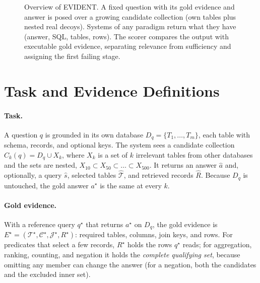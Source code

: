 \documentclass[11pt]{article}
\newcommand{\benchmark}{\mbox{EVIDENT}}  %
\begin{document}
\begin{figure}[t]
{}
\caption{Overview of \benchmark. A fixed question with its gold evidence and answer is posed over a growing candidate collection (own tables plus nested real decoys). Systems of any paradigm return what they have (answer, SQL, tables, rows). The scorer compares the output with executable gold evidence, separating relevance from sufficiency and assigning the first failing stage.}\label{fig:overview}
\end{figure}

\section{Task and Evidence Definitions}\label{sec:task}
\paragraph{Task.} A question $q$ is grounded in its own database $D_q=\{T_1,\dots,T_m\}$, each table with schema, records, and optional keys. The system sees a candidate collection $C_k(q)=D_q\cup X_k$, where $X_k$ is a set of $k$ irrelevant tables from other databases and the sets are nested, $X_{10}\subset X_{50}\subset\dots\subset X_{500}$. It returns an answer $\hat a$ and, optionally, a query $\hat s$, selected tables $\hat{\mathcal T}$, and retrieved records $\hat R$. Because $D_q$ is untouched, the gold answer $a^\star$ is the same at every $k$.

\paragraph{Gold evidence.} With a reference query $q^\star$ that returns $a^\star$ on $D_q$, the gold evidence is $E^\star=(\mathcal T^\star,\mathcal C^\star,\mathcal J^\star,R^\star)$: required tables, columns, join keys, and rows. For predicates that select a few records, $R^\star$ holds the rows $q^\star$ reads; for aggregation, ranking, counting, and negation it holds the \emph{complete qualifying set}, because omitting any member can change the answer (for a negation, both the candidates and the excluded inner set).
\end{document}
